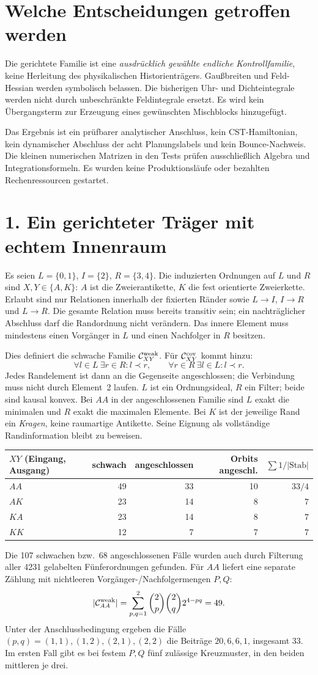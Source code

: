 \documentclass[10pt,a4paper]{article}
\newcommand{\sect}[1]{\section*{\color{navy}#1}}
\begin{document}
\sect{Welche Entscheidungen getroffen werden}
Die gerichtete Familie ist eine \emph{ausdrücklich gewählte endliche
Kontrollfamilie}, keine Herleitung des physikalischen Historienträgers.
Gaußbreiten und Feld-Hessian werden symbolisch belassen. Die bisherigen
Uhr- und Dichteintegrale werden nicht durch unbeschränkte Feldintegrale
ersetzt. Es wird kein Übergangsterm zur Erzeugung eines gewünschten
Mischblocks hinzugefügt.

Das Ergebnis ist ein prüfbarer analytischer Anschluss, kein CST-Hamiltonian,
kein dynamischer Abschluss der acht Planungslabels und kein Bounce-Nachweis.
Die kleinen numerischen Matrizen in den Tests prüfen ausschließlich Algebra
und Integrationsformeln. Es wurden keine Produktionsläufe oder bezahlten
Rechenressourcen gestartet.

\newpage
\sect{1. Ein gerichteter Träger mit echtem Innenraum}
Es seien $L=\{0,1\}$, $I=\{2\}$, $R=\{3,4\}$. Die induzierten Ordnungen
auf $L$ und $R$ sind $X,Y\in\{A,K\}$: $A$ ist die Zweierantikette, $K$ die
fest orientierte Zweierkette. Erlaubt sind nur Relationen innerhalb der
fixierten Ränder sowie $L\to I$, $I\to R$ und $L\to R$. Die gesamte Relation
muss bereits transitiv sein; ein nachträglicher Abschluss darf die
Randordnung nicht verändern. Das innere Element muss mindestens einen
Vorgänger in $L$ und einen Nachfolger in $R$ besitzen.

Dies definiert die schwache Familie $\mathcal C^{\rm weak}_{XY}$.
Für $\mathcal C^{\rm cov}_{XY}$ kommt hinzu:
\[
\forall l\in L\ \exists r\in R:l\prec r,
\qquad \forall r\in R\ \exists l\in L:l\prec r.
\]
Jedes Randelement ist dann an die Gegenseite angeschlossen; die Verbindung
muss nicht durch Element~2 laufen. $L$ ist ein Ordnungsideal, $R$ ein Filter;
beide sind kausal konvex. Bei $AA$ in der angeschlossenen Familie sind $L$
exakt die minimalen und $R$ exakt die maximalen Elemente. Bei $K$ ist der
jeweilige Rand ein \emph{Kragen}, keine raumartige Antikette. Seine Eignung
als vollständige Randinformation bleibt zu beweisen.

\begin{center}
\begin{tabular}{lrrrr}
\toprule
$XY$ (Eingang, Ausgang) & schwach & angeschlossen & Orbits angeschl. & $\sum1/|\mathrm{Stab}|$\\\midrule
$AA$ &49&33&10&$33/4$\\
$AK$ &23&14&8&$7$\\
$KA$ &23&14&8&$7$\\
$KK$ &12&7&7&$7$\\\bottomrule
\end{tabular}
\end{center}
Die 107 schwachen bzw.~68 angeschlossenen Fälle wurden auch durch Filterung
aller 4231 gelabelten Fünferordnungen gefunden. Für $AA$ liefert eine separate
Zählung mit nichtleeren Vorgänger-/Nachfolgermengen $P,Q$:
\[
|\mathcal C^{\rm weak}_{AA}|=
\sum_{p,q=1}^2\binom2p\binom2q2^{4-pq}=49.
\]
Unter der Anschlussbedingung ergeben die Fälle $(p,q)=(1,1),(1,2),(2,1),(2,2)$
die Beiträge $20,6,6,1$, insgesamt 33. Im ersten Fall gibt es bei festem
$P,Q$ fünf zulässige Kreuzmuster, in den beiden mittleren je drei.
\end{document}
